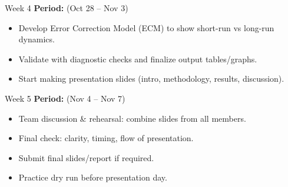 \begin{frame}{Week 4}
	\textbf{Period: }(Oct 28 – Nov 3)
	\begin{itemize}
		\item Develop Error Correction Model (ECM) to show short-run vs long-run dynamics.
		\item Validate with diagnostic checks and finalize output tables/graphs.
		\item Start making presentation slides (intro, methodology, results, discussion).
	\end{itemize}
\end{frame}

\begin{frame}{Week 5}
	\textbf{Period: }(Nov 4 – Nov 7)
	\begin{itemize}
		\item Team discussion \& rehearsal: combine slides from all members.
		\item Final check: clarity, timing, flow of presentation.
		\item Submit final slides/report if required.
		\item Practice dry run before presentation day.
	\end{itemize}
\end{frame}